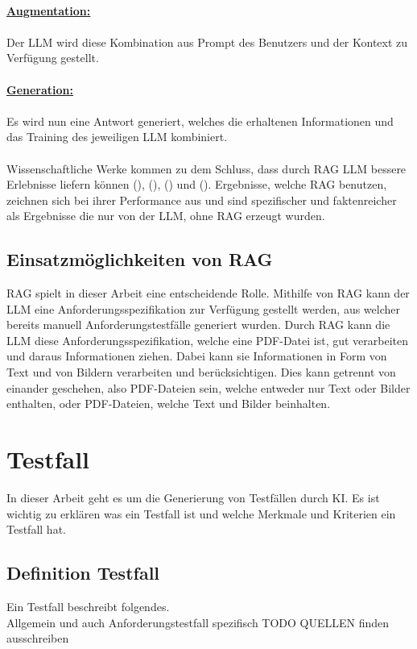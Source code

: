 \documentclass[12pt,toc=bib,toc=listof]{scrreprt}
\begin{document}
\\
\textbf{\underline{Augmentation:}}\\
\\
Der LLM wird diese Kombination aus Prompt des Benutzers und der Kontext zu Verfügung gestellt.\\
\\
\textbf{\underline{Generation:}}\\
\\
Es wird nun eine Antwort generiert, welches die erhaltenen Informationen und das Training des jeweiligen LLM kombiniert.\\
\\
Wissenschaftliche Werke kommen zu dem Schluss, dass durch RAG LLM bessere Erlebnisse liefern können (\cite{Gao2024}), (\cite{Lewis2021}), (\cite{Salemi2024}) und (\cite{Wu2024}). Ergebnisse, welche RAG benutzen, zeichnen sich bei ihrer Performance aus und sind spezifischer und faktenreicher als Ergebnisse die nur von der LLM, ohne RAG erzeugt wurden.

\subsection{Einsatzmöglichkeiten von RAG} %
\label{sec:einsatzmöglichkeitenVonRAG}
RAG spielt in dieser Arbeit eine entscheidende Rolle. Mithilfe von RAG kann der LLM eine Anforderungsspezifikation zur Verfügung gestellt werden, aus welcher bereits manuell Anforderungstestfälle generiert wurden. Durch RAG kann die LLM diese Anforderungsspezifikation, welche eine PDF-Datei ist, gut verarbeiten und daraus Informationen ziehen. Dabei kann sie Informationen in Form von Text und von Bildern verarbeiten und berücksichtigen. Dies kann getrennt von einander geschehen, also PDF-Dateien sein, welche entweder nur Text oder Bilder enthalten, oder PDF-Dateien, welche Text und Bilder beinhalten.

\section{Testfall} %
\label{sec:testfall}
In dieser Arbeit geht es um die Generierung von Testfällen durch KI. Es ist wichtig zu erklären was ein Testfall ist und welche Merkmale und Kriterien ein Testfall hat. 

\subsection{Definition Testfall} %
\label{sec:definitionTestfall}
Ein Testfall beschreibt folgendes.\\
Allgemein und auch Anforderungstestfall spezifisch
TODO QUELLEN finden ausschreiben
\end{document}
